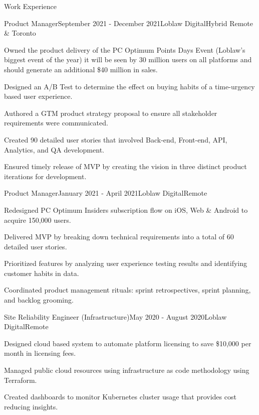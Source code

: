\documentclass{resume} %
\begin{document}
\begin{rSection}{Work Experience}

\begin{rSubsection}{Product Manager}{September 2021 - December 2021}{Loblaw Digital}{Hybrid Remote \& Toronto}
\item Owned the product delivery of the PC Optimum Points Days Event (Loblaw's biggest event of the year) it will be seen by 30 million users on all platforms and should generate an additional \$40 million in sales.
\item Designed an A/B Test to determine the effect on buying habits of a time-urgency based user experience.
\item Authored a GTM product strategy proposal to ensure all stakeholder requirements were communicated.
\item Created 90 detailed user stories that involved Back-end, Front-end, API, Analytics, and QA development.
\item Ensured timely release of MVP by creating the vision in three distinct product iterations for development. 
\end{rSubsection}


\begin{rSubsection}{Product Manager}{January 2021 - April 2021}{Loblaw Digital}{Remote}
\item Redesigned PC Optimum Insiders subscription flow on iOS, Web \& Android to acquire 150,000 users.
\item Delivered MVP by breaking down technical requirements into a total of 60 detailed user stories.
\item Prioritized features by analyzing user experience testing results and identifying customer habits in data.
\item Coordinated product management rituals: sprint retrospectives, sprint planning, and backlog grooming.
\end{rSubsection}


\begin{rSubsection}{Site Reliability Engineer (Infrastructure)}{May 2020 - August 2020}{Loblaw Digital}{Remote}
\item Designed cloud based system to automate platform licensing to save \$10,000 per month in licensing fees.
\item Managed public cloud resources using infrastructure as code methodology using Terraform.
\item Created dashboards to monitor Kubernetes cluster usage that provides cost reducing insights.
\end{rSubsection}


\end{rSection}
\end{document}
